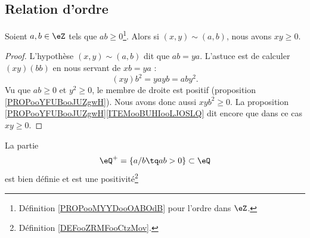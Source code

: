 \subsection{Relation d'ordre}

\begin{proposition}	\label{PROPooEBCHooYEQkIO}
	Soient \( a,b\in \eZ\) tels que \( ab\geq 0\)\footnote{Définition \ref{PROPooMYYDooOABOdB} pour l'ordre dans \( \eZ\).}. Alors si \( (x,y)\sim(a,b)\), nous avons \( xy\geq 0\).
\end{proposition}

\begin{proof}
	L'hypothèse \( (x,y)\sim (a,b)\) dit que \( ab=ya\). L'astuce est de calculer \( (xy)(bb)\) en nous servant de \( xb=ya\) :
	\begin{equation}
		(xy)b^2=yayb=aby^2.
	\end{equation}
	Vu que \( ab\geq 0\) et \( y^2\geq 0\), le membre de droite est positif (proposition \ref{PROPooYFUBooJUZgwH}). Nous avons donc aussi \( xyb^2\geq 0\). La proposition \ref{PROPooYFUBooJUZgwH}\ref{ITEMooBUHIooLJOSLQ} dit encore que dans ce cas \( xy\geq 0\).
\end{proof}


\begin{proposition}	\label{PROPooEOZWooLxRPXa}
	La partie
	\begin{equation}
		\eQ^+=\{ a/b\tq ab>0 \}\subset \eQ
	\end{equation}
	est bien définie et est une positivité\footnote{Définition \ref{DEFooZRMFooCtzMov}.}
\end{proposition}


